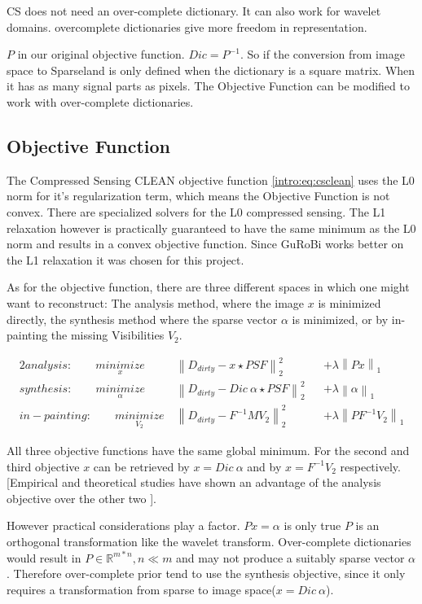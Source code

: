CS does not need an over-complete dictionary. It can also work for wavelet domains. overcomplete dictionaries give more freedom in representation.

$P$ in our original objective function. $Dic = P^{-1}$. So if the conversion from image space to Sparseland is only defined when the dictionary is a square matrix. When it has as many signal parts as pixels. The Objective Function can be modified to work with over-complete dictionaries.


\subsection{Objective Function}
The Compressed Sensing CLEAN objective function \eqref{intro:eq:csclean} uses the L0 norm for it's regularization term, which means the Objective Function is not convex. There are specialized solvers for the L0 compressed sensing. The L1 relaxation however is practically guaranteed to have the same minimum as the L0 norm and results in a convex objective function. Since GuRoBi works better on the L1 relaxation it was chosen for this project.

As for the objective function, there are three different spaces in which one might want to reconstruct: The analysis method, where the image $x$ is minimized directly, the synthesis method where the sparse vector $\alpha$ is minimized, or by in-painting the missing Visibilities $V_2$.

\begin{alignat*}{2}
	analysis:\qquad \underset{x}{minimize} \:& \left \| D_{dirty} - x \star PSF \right \|_2^2 &&+  \lambda \left \| Px \right \|_1 \\
	synthesis:\qquad \underset{\alpha}{minimize} \:& \left \| D_{dirty} - Dic \: \alpha \star PSF \right \|_2^2 &&+ \lambda \left \| \alpha \right \|_1 \\
	in-painting:\qquad \underset{V_2}{minimize} \:& \left \| D_{dirty} - F^{-1} M V_2 \right \|_2^2 &&+ \lambda \left \| PF^{-1}V_2\right \|_1
\end{alignat*}

All three objective functions have the same global minimum. For the second and third objective $x$ can be retrieved by $x = Dic\:\alpha$ and by $x = F^{-1}V_2$ respectively. [Empirical and theoretical studies have shown an advantage of the analysis objective over the other two \cite{something}]. 

However practical considerations play a factor. $Px = \alpha$ is only true $P$ is an orthogonal transformation like the wavelet transform. Over-complete dictionaries would result in $P \in \mathbb{R}^{m*n}, n \ll m$ and may not produce a suitably sparse vector $\alpha$. Therefore over-complete prior tend to use the synthesis objective, since it only requires a transformation from sparse to image space($x = Dic\:\alpha$).

